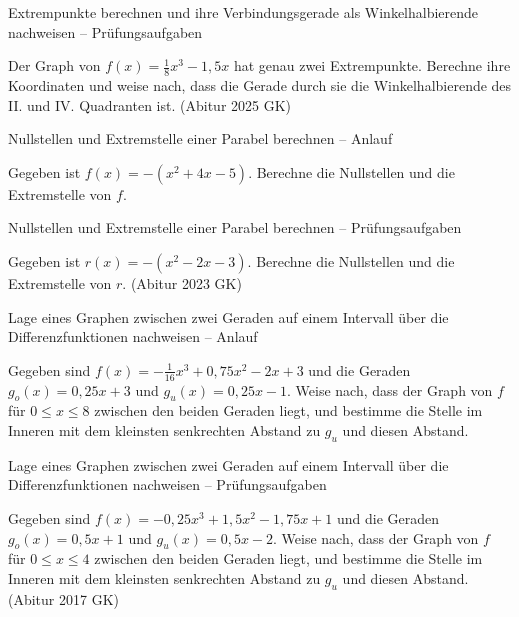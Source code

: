 \begin{aufgabe}{Extrempunkte berechnen und ihre Verbindungsgerade als Winkelhalbierende nachweisen – Prüfungsaufgaben}
\begin{teile}
\teil Der Graph von $f(x) = \frac{1}{8}x^3 - 1{,}5x$ hat genau zwei Extrempunkte. Berechne ihre Koordinaten und weise nach, dass die Gerade durch sie die Winkelhalbierende des II. und IV. Quadranten ist. \hfill (Abitur 2025 GK)
\end{teile}
\end{aufgabe}

\begin{aufgabe}{Nullstellen und Extremstelle einer Parabel berechnen – Anlauf}
\begin{teile}
\teil Gegeben ist $f(x) = -(x^2 + 4x - 5)$. Berechne die Nullstellen und die Extremstelle von $f$.
\end{teile}
\end{aufgabe}

\begin{aufgabe}{Nullstellen und Extremstelle einer Parabel berechnen – Prüfungsaufgaben}
\begin{teile}
\teil Gegeben ist $r(x) = -(x^2 - 2x - 3)$. Berechne die Nullstellen und die Extremstelle von $r$. \hfill (Abitur 2023 GK)
\end{teile}
\end{aufgabe}

\begin{aufgabe}{Lage eines Graphen zwischen zwei Geraden auf einem Intervall über die Differenzfunktionen nachweisen – Anlauf}
\begin{teile}
\teil Gegeben sind $f(x) = -\frac{1}{16}x^3 + 0{,}75x^2 - 2x + 3$ und die Geraden $g_o(x) = 0{,}25x + 3$ und $g_u(x) = 0{,}25x - 1$. Weise nach, dass der Graph von $f$ für $0 \le x \le 8$ zwischen den beiden Geraden liegt, und bestimme die Stelle im Inneren mit dem kleinsten senkrechten Abstand zu $g_u$ und diesen Abstand.
\end{teile}
\end{aufgabe}

\begin{aufgabe}{Lage eines Graphen zwischen zwei Geraden auf einem Intervall über die Differenzfunktionen nachweisen – Prüfungsaufgaben}
\begin{teile}
\teil Gegeben sind $f(x) = -0{,}25x^3 + 1{,}5x^2 - 1{,}75x + 1$ und die Geraden $g_o(x) = 0{,}5x + 1$ und $g_u(x) = 0{,}5x - 2$. Weise nach, dass der Graph von $f$ für $0 \le x \le 4$ zwischen den beiden Geraden liegt, und bestimme die Stelle im Inneren mit dem kleinsten senkrechten Abstand zu $g_u$ und diesen Abstand. \hfill (Abitur 2017 GK)
\end{teile}
\end{aufgabe}

